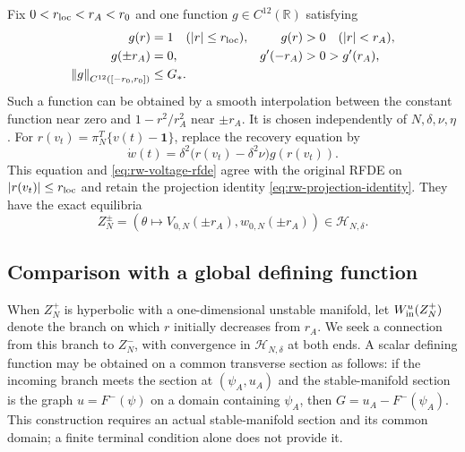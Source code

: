 Fix \(0<r_{\rm loc}<r_A<r_0\) and one function
\(g\in C^{12}(\mathbb R)\) satisfying
\begin{equation}
 \begin{aligned}
 g(r)&=1 \quad(\left\lvert r\right\rvert\le r_{\rm loc}),
 &g(r)&>0 \quad(\left\lvert r\right\rvert<r_A),\\
 g(\pm r_A)&=0,
 &g'(-r_A)&>0>g'(r_A),\\
 \left\lVert g\right\rVert_{C^{12}([-r_0,r_0])}&\le G_*.
 \end{aligned}
 \label{eq:rw-global-recovery-multiplier}
\end{equation}
Such a function can be obtained by a smooth interpolation between the
constant function near zero and \(1-r^2/r_A^2\) near \(\pm r_A\).
It is chosen independently of \(N,\delta,\nu,\eta\).
For \(r(v_t)=\pi_N^T\{v(t)-\mathbf1\}\), replace the recovery equation by
\begin{equation}
 \dot w(t)=\delta^2\bigl(r(v_t)-\delta^2\nu\bigr)g(r(v_t)).
 \label{eq:rw-modified-recovery}
\end{equation}
This equation and \eqref{eq:rw-voltage-rfde} agree with the original RFDE
on \(\left\lvert r(v_t)\right\rvert\le r_{\rm loc}\) and retain the projection identity
\eqref{eq:rw-projection-identity}.  They have the exact equilibria
\begin{equation}
 Z_N^\pm=
 \left(\theta\longmapsto V_{0,N}(\pm r_A),
       w_{0,N}(\pm r_A)\right)
 \in\mathcal H_{N,\delta}.
 \label{eq:rw-outer-equilibria}
\end{equation}

\subsection{Comparison with a global defining function}

When \(Z_N^+\) is hyperbolic with a one-dimensional unstable manifold, let
\(W_{\rm in}^u(Z_N^+)\) denote the branch on which \(r\) initially
decreases from \(r_A\).  We seek a connection from this branch to
\(Z_N^-\), with convergence in \(\mathcal H_{N,\delta}\) at both ends.
A scalar defining function may be obtained on a common transverse section
as follows: if the incoming branch meets the section at
\((\psi_A,u_A)\) and the stable-manifold section is the graph
\(u=F^-(\psi)\) on a domain containing \(\psi_A\), then
\(G=u_A-F^-(\psi_A)\).  This construction requires an actual
stable-manifold section and its common domain; a finite terminal condition
alone does not provide it.

